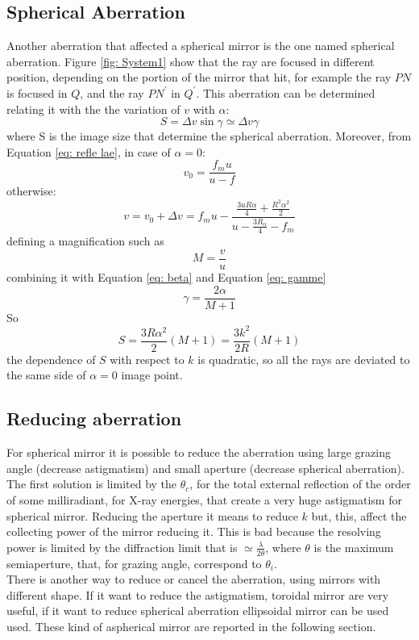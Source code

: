 \subsection{Spherical Aberration}
Another aberration that affected a spherical mirror is the one named spherical aberration. Figure \ref{fig: System1} show that the ray are focused in different position, depending on the portion of the mirror that hit, for example the ray $PN $ is focused in $Q $, and the ray $PN^{'} $ in $Q^{'} $.  This aberration can be determined relating it with the the variation of $v $ with $\alpha$:
\begin{equation}
S = \Delta v \sin \gamma \simeq \Delta v \gamma
\label{eq: S}
\end{equation}
\noindent where S is the image size that determine the spherical aberration. Moreover, from Equation \ref{eq: refle lae}, in case of $\alpha =0 $:
\begin{equation}
v_0 = \frac{f_m u}{u - f}
\label{eq: v0}
\end{equation}
\noindent otherwise:
\begin{equation}
v = v_0 + \Delta v = f_m u - \frac {\frac{3 u R \alpha}{4} + \frac{R^2 \alpha^2}{2}}{u - \frac{3 R_{\alpha}}{4} - f_m}
\label{eq: v}
\end{equation}
\noindent defining a magnification such as
\begin{equation}
M = \frac{v}{u}
\label{eq: M}
\end{equation}
\noindent combining it with Equation \ref{eq: beta} and Equation \ref{eq: gamme}
\begin{equation}
\gamma = \frac{2 \alpha}{M + 1}
\label{eq: new gamme}
\end{equation}
\noindent So
\begin{equation}
S = \frac{3 R \alpha^2}{2} (M + 1) = \frac{3 k^2}{2 R} (M + 1)
\label{eq: new S}
\end{equation}
\noindent the dependence of $S $ with respect to $k $ is quadratic, so all the rays are deviated to the same side of $\alpha = 0$ image point.
\subsection{Reducing aberration}
For spherical mirror it is possible to reduce the aberration using large grazing angle (decrease astigmatism) and small aperture (decrease spherical aberration). The first solution is limited by the $\theta_c $, for the total external reflection of the order of some milliradiant, for X-ray energies, that create a very huge astigmatism for spherical mirror.  
Reducing the aperture it means to reduce $k $ but, this, affect the collecting power of the mirror reducing it. This is bad because the resolving power is limited by the diffraction limit that is $\simeq \frac{\lambda}{2 \theta} $, where $\theta $ is the maximum semiaperture, that, for grazing angle, correspond to $\theta_i $.
\\
There is another way to reduce or cancel the aberration, using mirrors with different shape. If it want to reduce the astigmatism, toroidal mirror are very useful, if it want to reduce spherical aberration ellipsoidal mirror can be used used. These kind of aspherical mirror are reported in the following section.

